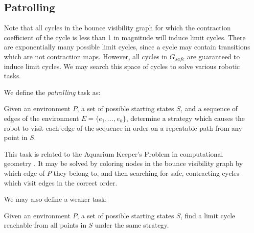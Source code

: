 \documentclass[]{styles/svproc}  %
\begin{document}
%
%


\subsection{Patrolling}

Note that all cycles in the bounce visibility graph for which the contraction coefficient of
the cycle is less than 1 in magnitude will induce limit cycles. There are
exponentially many possible limit cycles, since a cycle may contain
transitions which are not contraction maps. However, all cycles in $G_{safe}$
are guaranteed to induce limit cycles. We may search this space of cycles to
solve various robotic tasks.

We define the \emph{patrolling} task as:

\begin{definition}
Given an environment $P$, a set of possible starting states $S$, and
a sequence of edges of the environment $E = \{e_1, \ldots, e_k\}$,
determine a strategy which causes the robot to visit each edge of the sequence
in order on a repeatable path from any point in $S$.
\end{definition}

This task is related to the Aquarium Keeper's Problem in computational
geometry \cite{czyzowicz1991aquarium}. It may be solved by coloring nodes in the
bounce visibility graph by which edge of $P$ they belong to, and then searching
for safe, contracting cycles which visit edges in the correct order.

We may also define a weaker task:

\begin{definition}
Given an environment $P$, a set of possible starting states $S$, find a limit
cycle reachable from all points in $S$ under the same strategy.
\end{definition}
\end{document}
